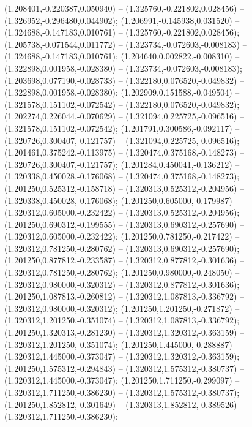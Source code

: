  (1.208401,-0.220387,0.050940) -- (1.325760,-0.221802,0.028456) -- (1.326952,-0.296480,0.044902);
 (1.206991,-0.145938,0.031520) -- (1.324688,-0.147183,0.010761) -- (1.325760,-0.221802,0.028456);
 (1.205738,-0.071544,0.011772) -- (1.323734,-0.072603,-0.008183) -- (1.324688,-0.147183,0.010761);
 (1.204640,0.002822,-0.008310) -- (1.322898,0.001958,-0.028380) -- (1.323734,-0.072603,-0.008183);
 (1.203698,0.077190,-0.028733) -- (1.322180,0.076520,-0.049832) -- (1.322898,0.001958,-0.028380);
 (1.202909,0.151588,-0.049504) -- (1.321578,0.151102,-0.072542) -- (1.322180,0.076520,-0.049832);
 (1.202274,0.226044,-0.070629) -- (1.321094,0.225725,-0.096516) -- (1.321578,0.151102,-0.072542);
 (1.201791,0.300586,-0.092117) -- (1.320726,0.300407,-0.121757) -- (1.321094,0.225725,-0.096516);
 (1.201461,0.375242,-0.113975) -- (1.320474,0.375168,-0.148273) -- (1.320726,0.300407,-0.121757);
 (1.201284,0.450041,-0.136212) -- (1.320338,0.450028,-0.176068) -- (1.320474,0.375168,-0.148273);
 (1.201250,0.525312,-0.158718) -- (1.320313,0.525312,-0.204956) -- (1.320338,0.450028,-0.176068);
 (1.201250,0.605000,-0.179987) -- (1.320312,0.605000,-0.232422) -- (1.320313,0.525312,-0.204956);
 (1.201250,0.690312,-0.199555) -- (1.320313,0.690312,-0.257690) -- (1.320312,0.605000,-0.232422);
 (1.201250,0.781250,-0.217422) -- (1.320312,0.781250,-0.280762) -- (1.320313,0.690312,-0.257690);
 (1.201250,0.877812,-0.233587) -- (1.320312,0.877812,-0.301636) -- (1.320312,0.781250,-0.280762);
 (1.201250,0.980000,-0.248050) -- (1.320312,0.980000,-0.320312) -- (1.320312,0.877812,-0.301636);
 (1.201250,1.087813,-0.260812) -- (1.320312,1.087813,-0.336792) -- (1.320312,0.980000,-0.320312);
 (1.201250,1.201250,-0.271872) -- (1.320312,1.201250,-0.351074) -- (1.320312,1.087813,-0.336792);
 (1.201250,1.320313,-0.281230) -- (1.320312,1.320312,-0.363159) -- (1.320312,1.201250,-0.351074);
 (1.201250,1.445000,-0.288887) -- (1.320312,1.445000,-0.373047) -- (1.320312,1.320312,-0.363159);
 (1.201250,1.575312,-0.294843) -- (1.320312,1.575312,-0.380737) -- (1.320312,1.445000,-0.373047);
 (1.201250,1.711250,-0.299097) -- (1.320312,1.711250,-0.386230) -- (1.320312,1.575312,-0.380737);
 (1.201250,1.852812,-0.301649) -- (1.320313,1.852812,-0.389526) -- (1.320312,1.711250,-0.386230);
